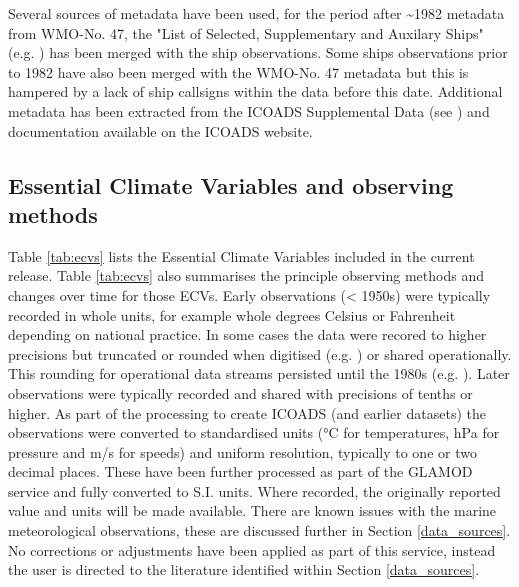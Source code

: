 Several sources of metadata have been used, for the period after \sim 1982 metadata from WMO-No. 47, the "List of Selected, Supplementary and Auxilary Ships" (e.g. \cite{Kent2007}) has been merged with the ship observations.
Some ships observations prior to 1982 have also been merged with the WMO-No. 47 metadata but this is hampered by a lack of ship callsigns within the data before this date.
Additional metadata has been extracted from the ICOADS Supplemental Data (see \cite{Freeman2017}) and documentation available on the ICOADS website.


\subsection{Essential Climate Variables and observing methods}

Table \ref{tab:ecvs} lists the Essential Climate Variables included in the current release. 
Table \ref{tab:ecvs} also summarises the principle observing methods and changes over time for those ECVs.
Early observations (< 1950s) were typically recorded in whole units, for example whole degrees Celsius or Fahrenheit depending on national practice.
In some cases the data were recored to higher precisions but truncated or rounded when digitised (e.g. \cite{Chan2019}) or shared operationally. 
This rounding for operational data streams persisted until the 1980s (e.g. \cite{Willett2008}).
Later observations were typically recorded and shared with precisions of tenths or higher.
As part of the processing to create ICOADS (and earlier datasets) the observations were converted to standardised units (°C for temperatures, hPa for pressure and m/s for speeds) and uniform resolution, typically to one or two decimal places.
These have been further processed as part of the GLAMOD service and fully converted to S.I. units.
Where recorded, the originally reported value and units will be made available.
There are known issues with the marine meteorological observations, these are discussed further in Section \ref{data_sources}.
No corrections or adjustments have been applied as part of this service, instead the user is directed to the literature identified within Section \ref{data_sources}.

